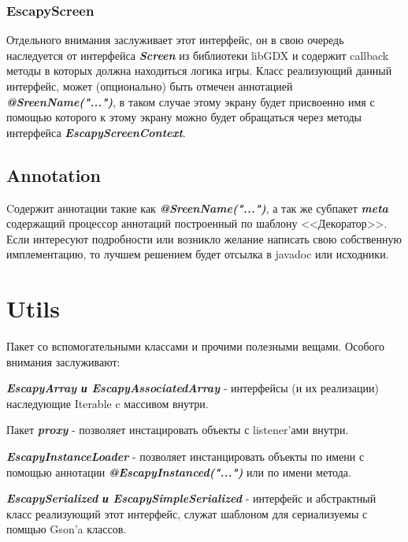 \documentclass[11pt]{report}
\newenvironment{itemize*}%
  {\begin{itemize}%
    \setlength{\itemsep}{2pt}%
    \setlength{\parskip}{0.75pt}}%
  {\end{itemize}}
\begin{document}
\subsection*{EscapyScreen}
Отдельного внимания заслуживает этот интерфейс, он в свою очередь наследуется от интерфейса \textit{\textbf{Screen}} из библиотеки libGDX и содержит callback методы в которых должна находиться логика игры. Класс реализующий данный интерфейс, может (опционально) быть отмечен аннотацией \textit{\textbf{@SreenName("...")}}, в таком случае этому экрану будет присвоенно имя с помощью которого к этому экрану можно будет обращаться через методы интерфейса \textit{\textbf{EscapyScreenContext}}.

\section{Annotation}
Cодержит аннотации такие как \textit{\textbf{@SreenName("...")}}, а так же субпакет 
\textit{\textbf{meta}} содержащий процессор аннотаций построенный по шаблону <<Декоратор>>. Если интересуют подробности или возникло желание написать свою собственную имплементацию, то лучшем решением будет отсылка в javadoc или исходники.



\chapter{Utils}
Пакет со вспомогательными классами и прочими полезными вещами. Особого внимания заслуживают: \begin{itemize*}
	
	\item \textit{\textbf{EscapyArray и EscapyAssociatedArray}} - интерфейсы (и их 				реализации) наследующие Iterable c массивом внутри.
	
	\item Пакет \textit{\textbf{proxy}} - позволяет инстацировать объекты с listener'ами 		внутри.
	
	\item \textit{\textbf{EscapyInstanceLoader}}  - позволяет инстанцировать объекты по 		имени с помощью аннотации \textit{\textbf{@EscapyInstanced("...")}} или по имени 			метода.

	\item \textit{\textbf{EscapySerialized и EscapySimpleSerialized}} - интерфейс и 			абстрактный класс реализующий этот интерфейс, служат шаблоном для сериализуемы с помщью
	Gson'a классов.
\end{itemize*}
	\newpage
\end{document}
